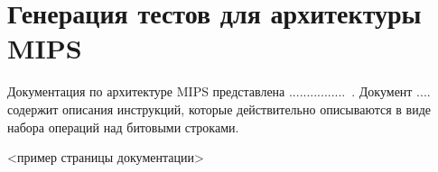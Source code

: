 \documentclass[14pt]{extreport}
\newtheorem{utv}{Утверждение}
\begin{document}



\section{Генерация тестов для архитектуры MIPS}


Документация по архитектуре MIPS представлена ................~\cite{??????????}. Документ
.... содержит описания инструкций, которые действительно описываются в виде набора
операций над битовыми строками.

<пример страницы документации>
\end{document}
